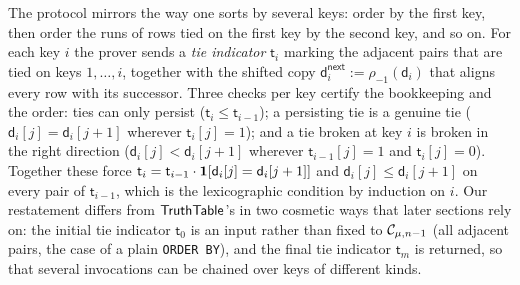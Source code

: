 \fi
The protocol mirrors the way one sorts by several keys: order by the first key, then order the runs of rows tied on the first key by the second key, and so on. For each key $i$ the prover sends a \emph{tie indicator} $\mathsf{t}_i$ marking the adjacent pairs that are tied on keys $1, \dots, i$, together with the shifted copy $\mathsf{d}_i^{\mathsf{next}} := \rho_{-1}(\mathsf{d}_i)$ that aligns every row with its successor. Three checks per key certify the bookkeeping and the order: ties can only persist ($\mathsf{t}_i \le \mathsf{t}_{i-1}$); a persisting tie is a genuine tie ($\mathsf{d}_i[j] = \mathsf{d}_i[j+1]$ wherever $\mathsf{t}_i[j] = 1$); and a tie broken at key $i$ is broken in the right direction ($\mathsf{d}_i[j] < \mathsf{d}_i[j+1]$ wherever $\mathsf{t}_{i-1}[j] = 1$ and $\mathsf{t}_i[j] = 0$). Together these force $\mathsf{t}_i = \mathsf{t}_{i-1} \cdot \mathbf{1}[\mathsf{d}_i[j] = \mathsf{d}_i[j+1]]$ and $\mathsf{d}_i[j] \le \mathsf{d}_i[j+1]$ on every pair of $\mathsf{t}_{i-1}$, which is the lexicographic condition by induction on $i$. Our restatement differs from $\mathsf{TruthTable}$'s in two cosmetic ways that later sections rely on: the initial tie indicator $\mathsf{t}_0$ is an input rather than fixed to $\mathcal{C}_{\mu,n-1}$ (all adjacent pairs, the case of a plain \texttt{ORDER BY}), and the final tie indicator $\mathsf{t}_m$ is returned, so that several invocations can be chained over keys of different kinds.
